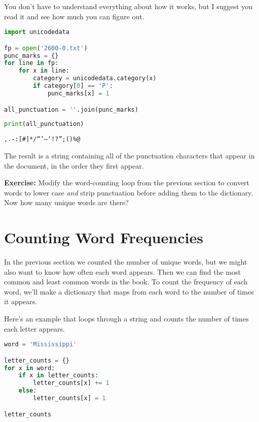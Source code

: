 You don't have to understand everything about how it works, but I
suggest you read it and see how much you can figure out.

\begin{lstlisting}[language=Python,style=source]
import unicodedata

fp = open('2600-0.txt')
punc_marks = {}
for line in fp:
    for x in line:
        category = unicodedata.category(x)
        if category[0] == 'P':
            punc_marks[x] = 1

all_punctuation = ''.join(punc_marks)
\end{lstlisting}

\pagebreak

\begin{lstlisting}[language=Python,style=source]
print(all_punctuation)
\end{lstlisting}

\begin{lstlisting}[style=output]
,.-:[#]*/“’—‘!?”;()%@
\end{lstlisting}

The result is a string containing all of the punctuation characters that
appear in the document, in the order they first appear.

\textbf{Exercise:} Modify the word-counting loop from the previous
section to convert words to lower case \emph{and} strip punctuation
before adding them to the dictionary. Now how many unique words are
there?

\section{Counting Word Frequencies}\label{counting-word-frequencies}

In the previous section we counted the number of unique words, but we
might also want to know how often each word appears. Then we can find
the most common and least common words in the book. To count the
frequency of each word, we'll make a dictionary that maps from each word
to the number of times it appears.

Here's an example that loops through a string and counts the number of
times each letter appears.

\begin{lstlisting}[language=Python,style=source]
word = 'Mississippi'

letter_counts = {}
for x in word:
    if x in letter_counts:
        letter_counts[x] += 1
    else:
        letter_counts[x] = 1

letter_counts
\end{lstlisting}

